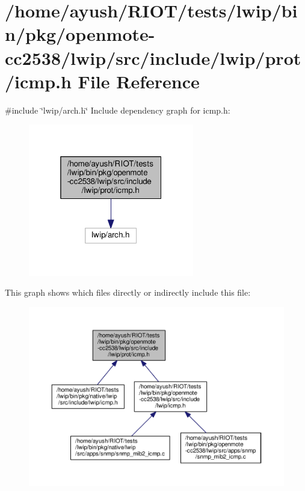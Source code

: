 \hypertarget{openmote-cc2538_2lwip_2src_2include_2lwip_2prot_2icmp_8h}{}\section{/home/ayush/\+R\+I\+O\+T/tests/lwip/bin/pkg/openmote-\/cc2538/lwip/src/include/lwip/prot/icmp.h File Reference}
\label{openmote-cc2538_2lwip_2src_2include_2lwip_2prot_2icmp_8h}
{\ttfamily \#include \char`\"{}lwip/arch.\+h\char`\"{}}\newline
Include dependency graph for icmp.\+h\+:
\nopagebreak
\begin{figure}[H]
\begin{center}
\leavevmode
\includegraphics[width=205pt]{openmote-cc2538_2lwip_2src_2include_2lwip_2prot_2icmp_8h__incl}
\end{center}
\end{figure}
This graph shows which files directly or indirectly include this file\+:
\nopagebreak
\begin{figure}[H]
\begin{center}
\leavevmode
\includegraphics[width=350pt]{openmote-cc2538_2lwip_2src_2include_2lwip_2prot_2icmp_8h__dep__incl}
\end{center}
\end{figure}
